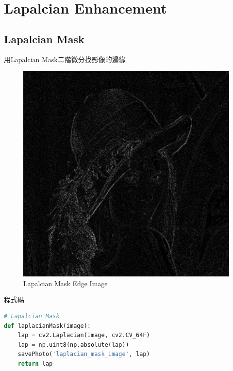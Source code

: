 \documentclass[12pt,a4paper]{article}
\begin{document}
\section{Lapalcian Enhancement}
\subsection{Lapalcian Mask}
{
用Lapalcian Mask二階微分找影像的邊緣
\begin{figure}[ht]
\centering
\includegraphics[width=.4\textwidth]{image/laplacian_mask_image.png}
\caption{Lapalcian Mask Edge Image}%
\label{要合併的兩張圖}%
\end{figure}

程式碼
\begin{lstlisting}[language=Python]
# Lapalcian Mask
def laplacianMask(image):
    lap = cv2.Laplacian(image, cv2.CV_64F)
    lap = np.uint8(np.absolute(lap))
    savePhoto('laplacian_mask_image', lap)
    return lap

\end{lstlisting}
}

\newpage
\end{document}
